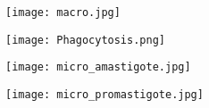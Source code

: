 \begin{figure}
\begin{minipage}{.5\textwidth}
\centering
\texttt{[image: macro.jpg]} 
\end{minipage}%
\begin{minipage}{.5\textwidth}
\centering
\texttt{[image: Phagocytosis.png]}
\end{minipage}%
\end{figure}
\begin{figure}
\begin{minipage}{.5\textwidth}
  \centering
  \texttt{[image: micro\_amastigote.jpg]} 
  \label{fig:test1}
\end{minipage}%
\begin{minipage}{.5\textwidth}
  \centering
  \texttt{[image: micro\_promastigote.jpg]} 
  \label{fig:test2}
\end{minipage}
\end{figure}
